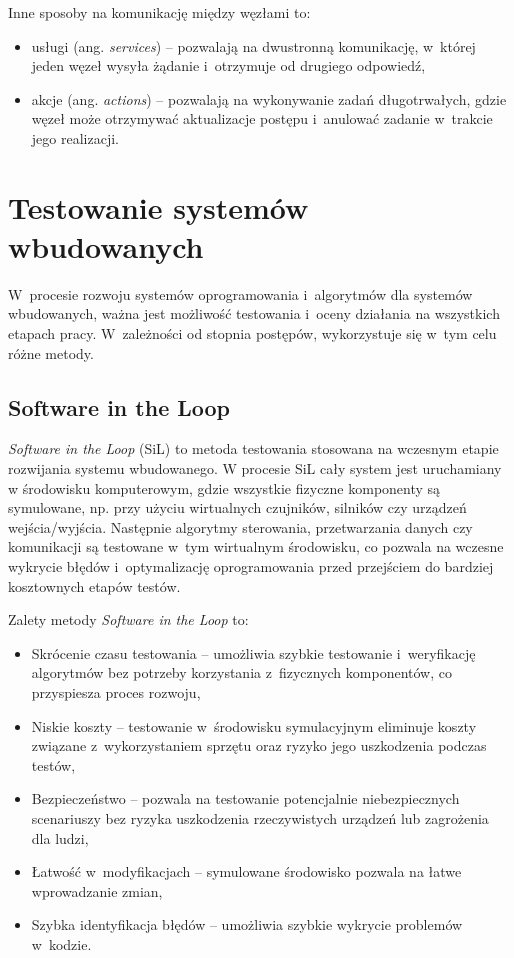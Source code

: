 Inne sposoby na komunikację między węzłami to:
\begin{itemize}
    \item usługi (ang. \textit{services}) -- pozwalają na dwustronną komunikację, w~której jeden węzeł wysyła żądanie i~otrzymuje od drugiego odpowiedź,
    \item akcje (ang. \textit{actions}) -- pozwalają na wykonywanie zadań długotrwałych, gdzie węzeł może otrzymywać aktualizacje postępu i~anulować zadanie w~trakcie jego realizacji.
\end{itemize}




\section{Testowanie systemów wbudowanych}
\label{sec:testowanie_teoria}

W~procesie rozwoju systemów oprogramowania i~algorytmów dla systemów wbudowanych, ważna jest możliwość testowania i~oceny działania na wszystkich etapach pracy. W~zależności od stopnia postępów, wykorzystuje się w~tym celu różne metody.

\subsection{Software in the Loop}
\textit{Software in the Loop} (SiL) to metoda testowania stosowana na wczesnym etapie rozwijania systemu wbudowanego. W procesie SiL cały system jest uruchamiany w środowisku komputerowym, gdzie wszystkie fizyczne komponenty są symulowane, np. przy użyciu wirtualnych czujników, silników czy urządzeń wejścia/wyjścia. Następnie algorytmy sterowania, przetwarzania danych czy komunikacji są testowane w~tym wirtualnym środowisku, co pozwala na wczesne wykrycie błędów i~optymalizację oprogramowania przed przejściem do bardziej kosztownych etapów testów.

Zalety metody \textit{Software in the Loop} to:
\begin{itemize}
    \item Skrócenie czasu testowania -- umożliwia szybkie testowanie i~weryfikację algorytmów bez potrzeby korzystania z~fizycznych komponentów, co przyspiesza proces rozwoju,
    \item Niskie koszty -- testowanie w~środowisku symulacyjnym eliminuje koszty związane z~wykorzystaniem sprzętu oraz ryzyko jego uszkodzenia podczas testów,
    \item Bezpieczeństwo -- pozwala na testowanie potencjalnie niebezpiecznych scenariuszy bez ryzyka uszkodzenia rzeczywistych urządzeń lub zagrożenia dla ludzi,
    \item Łatwość w~modyfikacjach -- symulowane środowisko pozwala na łatwe wprowadzanie zmian,
    \item Szybka identyfikacja błędów -- umożliwia szybkie wykrycie problemów w~kodzie.
\end{itemize}


